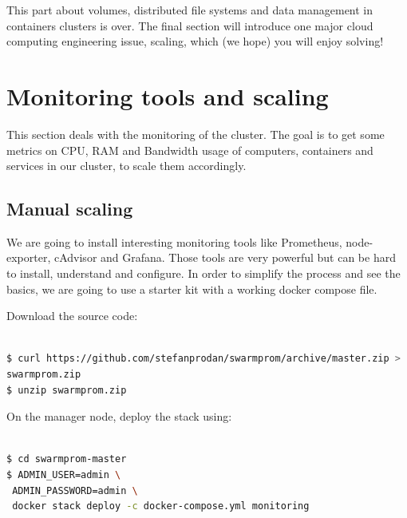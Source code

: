\documentclass[a4paper,11pt]{exam}
\begin{document}
This part about volumes, distributed file systems and data management in containers clusters is over.
The final section will introduce one major cloud computing engineering issue, scaling, which (we hope) you will enjoy solving!

\clearpage

\section{Monitoring tools and scaling}

This section deals with the monitoring of the cluster. 
The goal is to get some metrics on CPU, RAM and Bandwidth usage of computers, containers and services in our cluster, to scale them accordingly.

\subsection{Manual scaling}

We are going to install interesting monitoring tools like Prometheus, node-exporter, cAdvisor and Grafana. 
Those tools are very powerful but can be hard to install, understand and configure.
In order to simplify the process and see the basics, we are going to use a starter kit with a working docker compose file.

Download the source code:

\begin{lstlisting}[frame=single,language={sh}]  % Start your code-block

$ curl https://github.com/stefanprodan/swarmprom/archive/master.zip >  \
swarmprom.zip
$ unzip swarmprom.zip

\end{lstlisting}

On the manager node, deploy the stack using: 

\begin{lstlisting}[frame=single,language={sh}]  % Start your code-block

$ cd swarmprom-master
$ ADMIN_USER=admin \
 ADMIN_PASSWORD=admin \
 docker stack deploy -c docker-compose.yml monitoring
 
\end{lstlisting}
\end{document}
